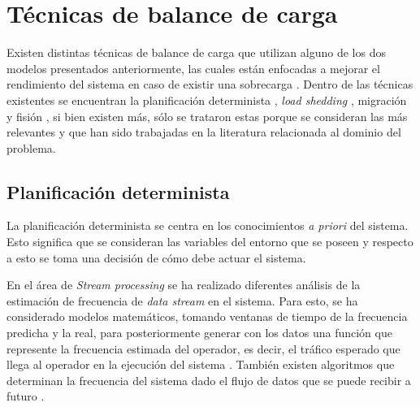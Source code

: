\section{Técnicas de balance de carga}
\label{sec:tecnicasBC}

Existen distintas técnicas de balance de carga que utilizan alguno de los dos modelos presentados anteriormente, las cuales están enfocadas a mejorar el rendimiento del sistema en caso de existir una sobrecarga \citep{HirzelSSGG13}. Dentro de las técnicas existentes se encuentran la planificación determinista \citep{XuCTS14, DongTS07}, \textit{load shedding} \citep{SheuC09}, migración \citep{XingZH05} y fisión \citep{GulisanoJPSV12, IshiiS11, GedikSHW14, FernandezMKP13}, si bien existen más, sólo se trataron estas porque se consideran las más relevantes y que han sido trabajadas en la literatura relacionada al dominio del problema.

\subsection{Planificación determinista}
\label{sec:planificacionBC}

La planificación determinista se centra en los conocimientos \textit{a priori} del sistema. Esto significa que se consideran las variables del entorno que se poseen y respecto a esto se toma una decisión de cómo debe actuar el sistema. 

En el área de \textit{Stream processing} se ha realizado diferentes análisis de la estimación de frecuencia de \textit{data stream} en el sistema. Para esto, se ha considerado modelos matemáticos, tomando ventanas de tiempo de la frecuencia predicha y la real, para posteriormente generar con los datos una función que represente la frecuencia estimada del operador, es decir, el tráfico esperado que llega al operador en la ejecución del sistema \citep{Ganguly09}. \normalsize{También existen algoritmos} que determinan la frecuencia del sistema dado el flujo de datos que se puede recibir a futuro \citep{BhuvanagiriGKS06}.

